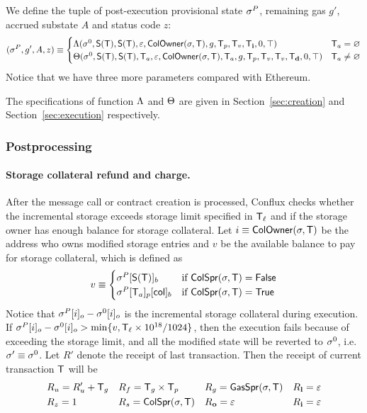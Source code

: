 We define the tuple of post-execution provisional state $\mathbf{\sigma}^{P}$, remaining gas $g'$, accrued substate $A$ and status code $z$:
\begin{align}\label{def:transform}
	(\mathbf{\sigma}^{P},g',A,z)\equiv
	\begin{cases}
		\mathrm{\Lambda}(\mathbf{\sigma}^0,\mathsf{S}{\left({\textsf{T}} \right)},\mathsf{S}{\left({\textsf{T}} \right)},\mathbb{\varepsilon}, \mathsf{ColOwner}(\mathbf{\sigma},\textsf{T}),g,\textsf{T}_p,\textsf{T}_v,\textsf{T}_{\bf i},0,\top) &  \textsf{T}_a=\varnothing \\
		\mathrm{\Theta}(\mathbf{\sigma}^0,\mathsf{S}{\left({\textsf{T}} \right)},\mathsf{S}{\left({\textsf{T}} \right)},\textsf{T}_a,\mathbb{\varepsilon},\mathsf{ColOwner}(\mathbf{\sigma},\textsf{T}),\textsf{T}_a,g,\textsf{T}_p,\textsf{T}_v,\textsf{T}_v,\textsf{T}_{\bf d},0,\top) & \textsf{T}_a\neq\varnothing
	\end{cases}
\end{align}
%
Notice that we have three more parameters compared with Ethereum. 

The specifications of function $\mathrm{\Lambda}$ and $\mathrm{\Theta}$ are given in Section~\ref{sec:creation} and Section~\ref{sec:execution} respectively.

\subsubsection{Postprocessing}\label{sec:tx_post_process}

\paragraph{Storage collateral refund and charge.}

After the message call or contract creation is processed, Conflux checks whether the incremental storage exceeds storage limit specified in $\textsf{T}_\ell$ and if the storage owner has enough balance for storage collateral. 
Let $i\equiv \mathsf{ColOwner}(\mathbf{\sigma},\textsf{T})$ be the address who owns modified storage entries and $v$ be the available balance to pay for storage collateral, which is defined as 
\begin{align}
	v \equiv \begin{cases}
		\mathbf{\sigma}^{P}[\mathsf{S}{\left({\textsf{T}} \right)}]_b & \text{if }\mathsf{ColSpr}(\mathbf{\sigma},\textsf{T})=\mathsf{False} \\
		\mathbf{\sigma}^{P}[\textsf{T}_a]_p[{\sf col}]_b &  \text{if }\mathsf{ColSpr}(\mathbf{\sigma},\textsf{T})=\mathsf{True}
	\end{cases}
\end{align}
%
Notice that $\mathbf{\sigma}^P[i]_o-\mathbf{\sigma}^0[i]_o$ is the incremental storage collateral during execution.
If $\mathbf{\sigma}^P[i]_o-\mathbf{\sigma}^0[i]_o>\min\{v,\textsf{T}_\ell\times 10^{18}/1024\}$, then the execution fails because of exceeding the storage limit, 
and all the modified state will be reverted to $\mathbf{\sigma}^0$, 
i.e. $\mathbf{\sigma}'\equiv\mathbf{\sigma}^0$. 
Let $R'$ denote the receipt of last transaction.
Then the receipt of current transaction $\textsf{T}$ will be 
\begin{align}
	&R_u=R'_u+\textsf{T}_g && R_f = \textsf{T}_g\times\textsf{T}_p && R_g = \mathsf{GasSpr}(\mathbf{\sigma},\textsf{T}) && R_{\bf l}=\mathbb{\varepsilon} \\
	&R_z=1 && R_s = \mathsf{ColSpr}(\mathbf{\sigma},\textsf{T}) && R_{\bf o}=\mathbb{\varepsilon} && R_{\bf i}=\mathbb{\varepsilon}
\end{align}

